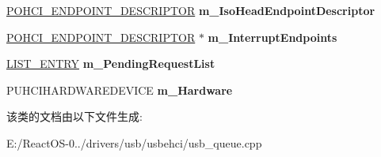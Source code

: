 \begin{DoxyCompactItemize}
\item 
\mbox{\label{class_c_u_s_b_queue_a0953620e517dcb6fcea61875bf65f26d}} 
\hyperlink{struct___o_h_c_i___e_n_d_p_o_i_n_t___d_e_s_c_r_i_p_t_o_r}{P\+O\+H\+C\+I\+\_\+\+E\+N\+D\+P\+O\+I\+N\+T\+\_\+\+D\+E\+S\+C\+R\+I\+P\+T\+OR} {\bfseries m\+\_\+\+Iso\+Head\+Endpoint\+Descriptor}
\item 
\mbox{\label{class_c_u_s_b_queue_a08b182c8072fb65503ad825fc244438b}} 
\hyperlink{struct___o_h_c_i___e_n_d_p_o_i_n_t___d_e_s_c_r_i_p_t_o_r}{P\+O\+H\+C\+I\+\_\+\+E\+N\+D\+P\+O\+I\+N\+T\+\_\+\+D\+E\+S\+C\+R\+I\+P\+T\+OR} $\ast$ {\bfseries m\+\_\+\+Interrupt\+Endpoints}
\item 
\mbox{\label{class_c_u_s_b_queue_aefb7f53f5162b2eb37a124f4297d48f5}} 
\hyperlink{struct___l_i_s_t___e_n_t_r_y}{L\+I\+S\+T\+\_\+\+E\+N\+T\+RY} {\bfseries m\+\_\+\+Pending\+Request\+List}
\item 
\mbox{\label{class_c_u_s_b_queue_abf0e1412c260e9e6de4a88a48d808943}} 
P\+U\+H\+C\+I\+H\+A\+R\+D\+W\+A\+R\+E\+D\+E\+V\+I\+CE {\bfseries m\+\_\+\+Hardware}
\end{DoxyCompactItemize}


该类的文档由以下文件生成\+:\begin{DoxyCompactItemize}
\item 
E\+:/\+React\+O\+S-\/0../drivers/usb/usbehci/usb\+\_\+queue.\+cpp\end{DoxyCompactItemize}

